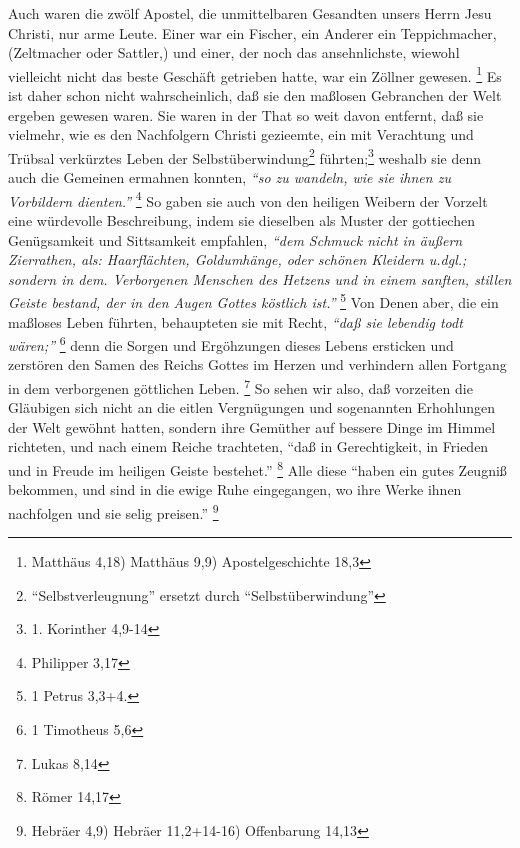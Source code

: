 Auch waren die zwölf Apostel, die unmittelbaren Gesandten unsers Herrn Jesu
Christi, nur arme Leute. Einer war ein Fischer, ein Anderer ein Teppichmacher,
(Zeltmacher oder Sattler,) und einer, der noch das ansehnlichste, wiewohl
vielleicht nicht das beste Geschäft getrieben hatte, war ein Zöllner
gewesen.
\footnote{Matthäus 4,18) Matthäus 9,9) Apostelgeschichte 18,3} 
Es ist daher
schon nicht wahrscheinlich, daß sie den maßlosen Gebranchen der Welt ergeben
gewesen waren. Sie waren in der That so weit davon entfernt, daß sie vielmehr,
wie es den Nachfolgern Christi gezieemte, ein mit Verachtung und Trübsal
verkürztes Leben der Selbstüberwindung\footnote{"`Selbstverleugnung"' ersetzt durch "`Selbstüberwindung"'} führten;\footnote{1. Korinther 4,9-14} 
weshalb
sie denn auch die Gemeinen ermahnen konnten, 
\textit{"`so zu wandeln, wie sie ihnen zu
Vorbildern dienten."'}
\footnote{Philipper 3,17} 
So gaben sie auch von den heiligen
Weibern der Vorzelt eine würdevolle Beschreibung, indem sie dieselben als Muster
der gottiechen Genügsamkeit und Sittsamkeit empfahlen, 
\textit{"`dem Schmuck nicht in
äußern Zierrathen, als: Haarflächten, Goldumhänge, oder schönen Kleidern u.dgl.;
sondern in dem. Verborgenen Menschen des Hetzens und in einem sanften, stillen
Geiste bestand, der in den Augen Gottes köstlich ist."'}
\footnote{1 Petrus 3,3+4.} 
Von Denen aber, die ein maßloses Leben führten, behaupteten sie mit Recht,
\textit{"`daß sie lebendig todt wären;"'}
\footnote{1 Timotheus 5,6} 
denn die Sorgen und
Ergöhzungen dieses Lebens ersticken und zerstören den Samen des Reichs Gottes im
Herzen und verhindern allen Fortgang in dem verborgenen göttlichen
Leben.
\footnote{Lukas 8,14} 
So sehen wir also, daß vorzeiten die Gläubigen sich
nicht an die eitlen Vergnügungen und sogenannten Erhohlungen der Welt gewöhnt
hatten, sondern ihre Gemüther auf bessere Dinge im Himmel richteten, und nach
einem Reiche trachteten, 
"`daß in Gerechtigkeit, in Frieden und in Freude im
heiligen Geiste bestehet."'
\footnote{Römer 14,17} 
Alle diese 
"`haben ein gutes
Zeugniß bekommen, und sind in die ewige Ruhe eingegangen, wo ihre Werke ihnen
nachfolgen und sie selig preisen."'
\footnote{Hebräer 4,9) Hebräer 11,2+14-16)
Offenbarung 14,13}

